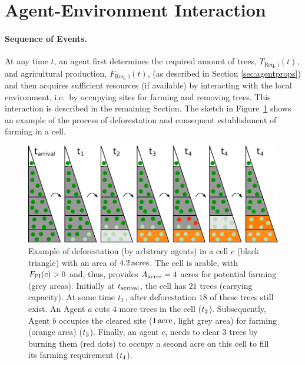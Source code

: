 \FloatBarrier
\section{Agent-Environment Interaction} \label{sec:Harvest}
\paragraph{Sequence of Events.}
At any time $t$, an agent first determines the required amount of trees, $T_\text{Req, i}(t)$, and agricultural production, $F_\text{Req, i}(t)$, (as described in Section \ref{sec:agentprops}) and then acquires sufficient resources (if available) by interacting with the local environment, i.e.\ by occupying sites for farming and removing trees.
This interaction is described in the remaining Section.
The sketch in Figure~\ref{fig:treeburning} shows an example of the process of deforestation and consequent establishment of farming in a cell.
\begin{figure}
	\centering
	\includegraphics[width=\textwidth]{images/SketchABM2/burningSketch_triangle.pdf}
	\caption{Example of deforestation (by arbitrary agents) in a cell $c$ (black triangle) with an area of $4.2\, \rm{acres}$.
		The cell is arable, with $F_{\rm PI}(c)>0$ and, thus, provides $A_{\rm acres}=4$ acres for potential farming (grey areas).
		Initially at $t_{\rm arrival}$, the cell has $21$ trees (carrying capacity).
		At some time $t_{\rm 1}$, after deforestation $18$ of these trees still exist. 
		An Agent $a$ cuts $4$ more trees in the cell (\ra $t_{\rm 2}$). 
		Subsequently, Agent $b$ occupies the cleared site ($1\, {\rm acre}$, light grey area) for farming (orange area) (\ra $t_{\rm 3}$). 
		Finally, an agent $c$, needs to clear $3$ trees by burning them (red dots) to occupy a second acre on this cell to fill its farming requirement (\ra $t_{\rm 4}$).}
	\label{fig:treeburning}
\end{figure}


